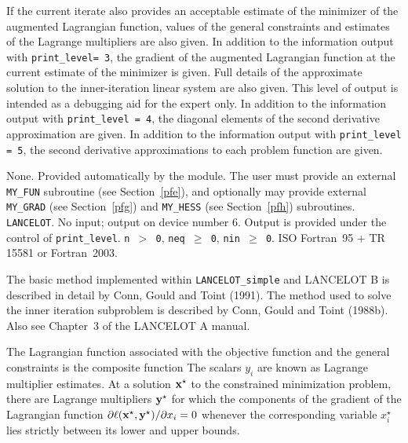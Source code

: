 \documentclass{galahad}
\newcommand{\packagename}{LANCELOT\_simple}
\newcommand{\calC}{{\cal C}}
\begin{document}
\begin{description}
                 If the current iterate also provides an acceptable
                 estimate of the minimizer of the augmented Lagrangian
                 function, values of the general constraints and
                 estimates of the Lagrange multipliers are also given.
 In addition to the information output with
                 {\tt print\_level= 3},
                 the gradient of the augmented Lagrangian function at
                 the current estimate of the minimizer is given.
                 Full details of the approximate solution
                 to the inner-iteration linear system are also given.
                 This level of output is intended as a debugging aid
                 for the expert only.
 In addition to the information output with
                 {\tt print\_level = 4},
                 the diagonal elements of the second derivative
                 approximation are given.
 In addition to the information output with
                  {\tt print\_level = 5},
                  the second derivative approximations
                  to each problem function are given.
\end{description}


\galgeneral

\galcommon None.
\galworkspace Provided automatically by the module.
\galroutines The user must provide an external {\tt MY\_FUN} subroutine
(see Section~\ref{pfe}), and optionally may provide
external {\tt MY\_GRAD} (see Section~\ref{pfg}) and
{\tt MY\_HESS} (see Section~\ref{pfh}) subroutines.
\galmodules
{\tt LANCELOT}.
\galio No input; output on device number 6.
    Output is provided under the control of {\tt print\_level}.
\galrestrictions
     {\tt n $>$ 0},
     {\tt neq $\geq$ 0},
     {\tt nin $\geq$ 0}.
\galportability ISO Fortran~95 + TR 15581 or Fortran~2003.


\galmethod
The basic method implemented within {\tt \packagename} and LANCELOT B is
described in detail by Conn, Gould and Toint (1991).  The method used to solve
the inner iteration subproblem is described by Conn, Gould and Toint
(1988b).  Also see Chapter~3 of the {\sf LANCELOT A} manual.

The Lagrangian function associated with the objective function
and the general constraints is the
composite function \disp{\ell( \bmx, \bmy ) = f(\bmx) + \sum_{i \in
\calC} y_i c_i (\bmx).}  The scalars $y_i$ are known as Lagrange
multiplier estimates.  At a solution ${\mathbf{x}}^{\star}$ to the constrained
minimization problem, there are Lagrange multipliers ${\mathbf{y}}^{\star}$ for
which the components of the gradient of the Lagrangian function
$\partial \ell({\mathbf{x}}^{\star}, {\mathbf{y}}^{\star}) / \partial x_i= 0$ whenever
the corresponding variable $x_i^{\star}$ lies strictly between its lower
and upper bounds.
\end{document}

